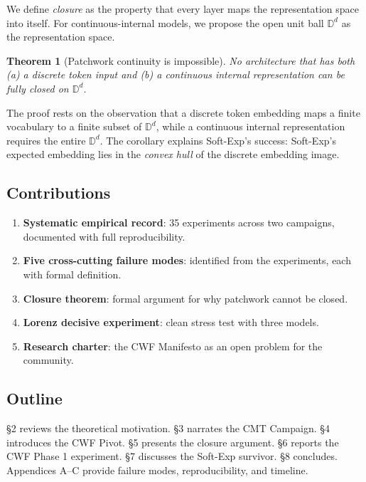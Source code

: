 \documentclass{article}
\newtheorem{theorem}{Theorem}
\begin{document}
We define \emph{closure} as the property that every layer maps the representation space into itself. For continuous-internal models, we propose the open unit ball $\mathbb{D}^d$ as the representation space.

\begin{theorem}[Patchwork continuity is impossible]
No architecture that has both (a) a discrete token input and (b) a continuous internal representation can be fully closed on $\mathbb{D}^d$.
\end{theorem}

The proof rests on the observation that a discrete token embedding maps a finite vocabulary to a finite subset of $\mathbb{D}^d$, while a continuous internal representation requires the entire $\mathbb{D}^d$. The corollary explains Soft-Exp's success: Soft-Exp's expected embedding lies in the \emph{convex hull} of the discrete embedding image.

\subsection{Contributions}

\begin{enumerate}
    \item \textbf{Systematic empirical record}: 35 experiments across two campaigns, documented with full reproducibility.
    \item \textbf{Five cross-cutting failure modes}: identified from the experiments, each with formal definition.
    \item \textbf{Closure theorem}: formal argument for why patchwork cannot be closed.
    \item \textbf{Lorenz decisive experiment}: clean stress test with three models.
    \item \textbf{Research charter}: the CWF Manifesto as an open problem for the community.
\end{enumerate}

\subsection{Outline}

\S2 reviews the theoretical motivation. \S3 narrates the CMT Campaign. \S4 introduces the CWF Pivot. \S5 presents the closure argument. \S6 reports the CWF Phase 1 experiment. \S7 discusses the Soft-Exp survivor. \S8 concludes. Appendices A--C provide failure modes, reproducibility, and timeline.
\end{document}
